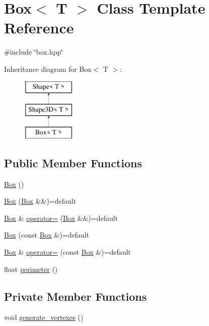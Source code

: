 \hypertarget{classBox}{}\section{Box$<$ T $>$ Class Template Reference}
\label{classBox}


{\ttfamily \#include \char`\"{}box.\+hpp\char`\"{}}

Inheritance diagram for Box$<$ T $>$\+:\begin{figure}[H]
\begin{center}
\leavevmode
\includegraphics[height=3.000000cm]{classBox}
\end{center}
\end{figure}
\subsection*{Public Member Functions}
\begin{DoxyCompactItemize}
\item 
\mbox{\hyperlink{classBox_a057f84d8fa68647c6484d4e004d8ab74}{Box}} ()
\item 
\mbox{\hyperlink{classBox_af72b67fa2f421acbe9a7d3d1bcd540d1}{Box}} (\mbox{\hyperlink{classBox}{Box}} \&\&)=default
\item 
\mbox{\hyperlink{classBox}{Box}} \& \mbox{\hyperlink{classBox_a09995e3360b336b8a477d84804a5a70d}{operator=}} (\mbox{\hyperlink{classBox}{Box}} \&\&)=default
\item 
\mbox{\hyperlink{classBox_aab49a6687d04530ec60421bcbdb929c2}{Box}} (const \mbox{\hyperlink{classBox}{Box}} \&)=default
\item 
\mbox{\hyperlink{classBox}{Box}} \& \mbox{\hyperlink{classBox_a6ea0d233bdcce789b46384d22601da8d}{operator=}} (const \mbox{\hyperlink{classBox}{Box}} \&)=default
\item 
float \mbox{\hyperlink{classBox_ac64e9d619b0f3b991174a2ac49fef899}{perimeter}} ()
\end{DoxyCompactItemize}
\subsection*{Private Member Functions}
\begin{DoxyCompactItemize}
\item 
void \mbox{\hyperlink{classBox_a7f7b061bf913f9ab47bff75536bc137d}{generate\+\_\+vertexes}} ()
\end{DoxyCompactItemize}
